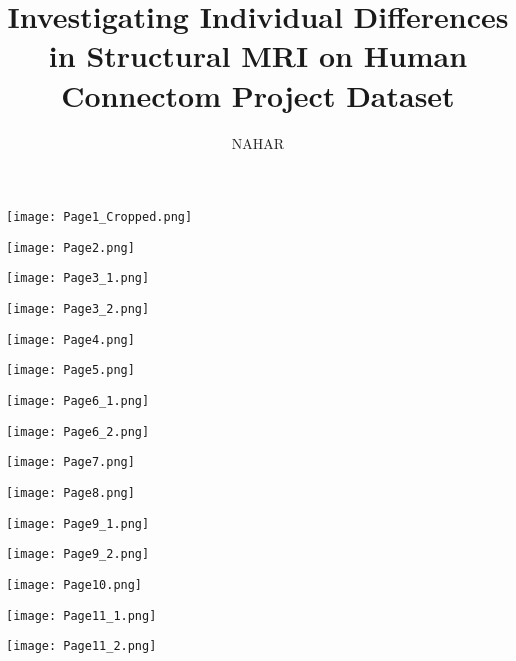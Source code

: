 \documentclass[]{article}
\title{Investigating Individual Differences in Structural MRI on Human Connectom Project Dataset}
\author{NAHAR}
\begin{document}
\maketitle
\thispagestyle{empty}
\newpage
{}
\centerline{\texttt{[image: Page1\_Cropped.png]}}
\centerline{\texttt{[image: Page2.png]}}
\centerline{\texttt{[image: Page3\_1.png]}}
\centerline{\texttt{[image: Page3\_2.png]}}
\centerline{\texttt{[image: Page4.png]}}
\centerline{\texttt{[image: Page5.png]}}
\centerline{\texttt{[image: Page6\_1.png]}}
\centerline{\texttt{[image: Page6\_2.png]}}
\centerline{\texttt{[image: Page7.png]}}
\centerline{\texttt{[image: Page8.png]}}
\centerline{\texttt{[image: Page9\_1.png]}}
\centerline{\texttt{[image: Page9\_2.png]}}
\centerline{\texttt{[image: Page10.png]}}
\centerline{\texttt{[image: Page11\_1.png]}}
\centerline{\texttt{[image: Page11\_2.png]}}
\end{document}

